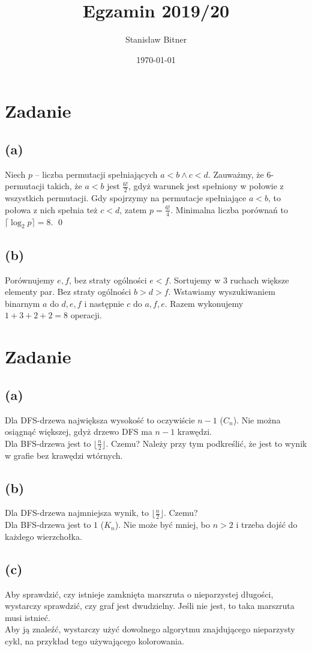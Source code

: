 \documentclass[12pt, a4paper]{article}
\title{Egzamin 2019/20}
\author{Stanisław Bitner}
\date{\today}
\newcounter{zadanie}
\newcommand{\zadanie}{\addtocounter{zadanie}{1}\section*{Zadanie \arabic{zadanie}}}
\begin{document}
\maketitle
\zadanie{}
\subsection*{(a)}
Niech $p$ -- liczba permutacji spełniających $a<b \land c<d$. Zauważmy, że
6-permutacji takich, że $a<b$ jest $\frac{6!}{2}$, gdyż warunek jest spełniony
w połowie z wszystkich permutacji. Gdy spojrzymy na permutacje spełniające
$a<b$, to połowa z nich spełnia też $c<d$, zatem $p = \frac{6!}{4}$. Minimalna
liczba porównań to $\lceil\log_2{p}\rceil = 8$. \qed

\subsection*{(b)}
Porównujemy $e,f$, bez straty ogólności $e<f$. Sortujemy w $3$ ruchach większe
elementy par. Bez straty ogólności $b>d>f$. Wstawiamy wyszukiwaniem binarnym
$a$ do $d,e,f$ i następnie $c$ do $a,f,e$. Razem wykonujemy $1+3+2+2 = 8$
operacji.

\zadanie{}
\subsection*{(a)}
Dla DFS-drzewa największa wysokość to oczywiście $n-1$ ($C_n$). Nie można
osiągnąć większej, gdyż drzewo DFS ma $n-1$ krawędzi.\\
Dla BFS-drzewa jest to $\lfloor\frac{n}{2}\rfloor$. Czemu? Należy przy tym podkreślić,
że jest to wynik w grafie bez krawędzi wtórnych.

\subsection*{(b)}
Dla DFS-drzewa najmniejsza wynik, to $\lfloor\frac{n}{2}\rfloor$. Czemu?\\
Dla BFS-drzewa jest to $1$ ($K_n$). Nie może być mniej, bo $n>2$ i trzeba dojść
do każdego wierzchołka.

\subsection*{(c)}
Aby sprawdzić, czy istnieje zamknięta marszruta o nieparzystej długości,
wystarczy sprawdzić, czy graf jest dwudzielny. Jeśli nie jest, to taka
marszruta musi istnieć.\\
Aby ją znaleźć, wystarczy użyć dowolnego algorytmu znajdującego nieparzysty
cykl, na przykład tego używającego kolorowania.
\end{document}
